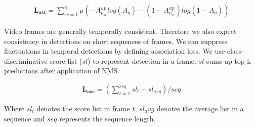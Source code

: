 \begin{align*}
\mathbf{L_{\text{att}}} = \sum_{sc=1}^6 \mu (-A^{up}_{p_{sc}} log(A_g) - (1-A^{up}_{p_{sc}})log(1-A_g))
\end{align*}

Video frames are generally temporally consistent. Therefore we also expect consistency in detections on short sequences of frames. We can suppress fluctuations in temporal detections by defining association loss. We use class-discriminative score list ($sl$) to represent detection in a frame. $sl$ sums up top-k predictions after application of NMS.

\begin{align*}
\mathbf{L_{\text{asc}}} = (\sum_{t=1}^{seq} sl_t - sl_{avg})/seq
\end{align*}

Where $sl_t$ denotes the score list in frame $t$, $sl_avg$ denotes the average list in a sequence and $seq$ represents the sequence length. 
